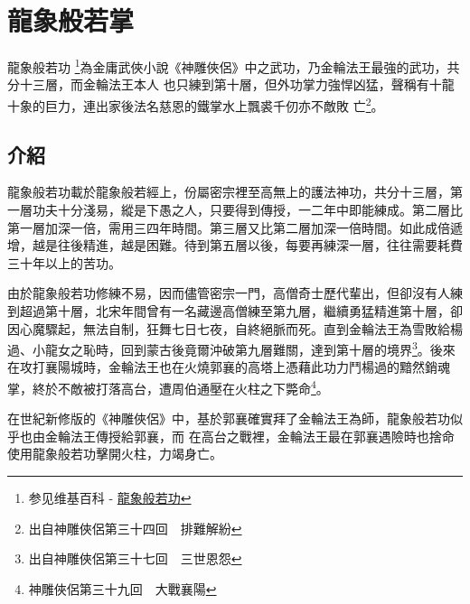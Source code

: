 \chapter{龍象般若掌}
龍象般若功
\footnote{参见维基百科 - \href{http://zh.wikipedia.org/wiki/\%E9\%BE\%8D\%E8\%B1\%A1\%E8\%88\%AC\%E8\%8B\%A5\%E6\%8E\%8C}{
    龍象般若功}}為金庸武俠小說《神雕俠侶》中之武功，乃金輪法王最強的武功，共分十三層，而金輪法王本人
也只練到第十層，但外功掌力強悍凶猛，聲稱有十龍十象的巨力，連出家後法名慈恩的鐵掌水上飄裘千仞亦不敵敗
亡\footnote{出自神雕俠侶第三十四回　排難解紛}。

\section{介紹}

龍象般若功載於龍象般若經上，份屬密宗裡至高無上的護法神功，共分十三層，第一層功夫十分淺易，縱是下愚之人，只要得到傳授，一二年中即能練成。第二層比第一層加深一倍，需用三四年時間。第三層又比第二層加深一倍時間。如此成倍遞增，越是往後精進，越是困難。待到第五層以後，每要再練深一層，往往需要耗費三十年以上的苦功。

由於龍象般若功修練不易，因而儘管密宗一門，高僧奇士歷代輩出，但卻沒有人練到超過第十層，北宋年間曾有一名藏邊高僧練至第九層，繼續勇猛精進第十層，卻因心魔驟起，無法自制，狂舞七日七夜，自終絕脈而死。直到金輪法王為雪敗給楊過、小龍女之恥時，回到蒙古後竟爾沖破第九層難關，達到第十層的境界\footnote{出自神雕俠侶第三十七回　三世恩怨}。後來在攻打襄陽城時，金輪法王也在火燒郭襄的高塔上憑藉此功力鬥楊過的黯然銷魂掌，終於不敵被打落高台，遭周伯通壓在火柱之下斃命\footnote{神雕俠侶第三十九回　大戰襄陽}。

在世紀新修版的《神雕俠侶》中，基於郭襄確實拜了金輪法王為師，龍象般若功似乎也由金輪法王傳授給郭襄，而
在高台之戰裡，金輪法王最在郭襄遇險時也捨命使用龍象般若功擊開火柱，力竭身亡。

